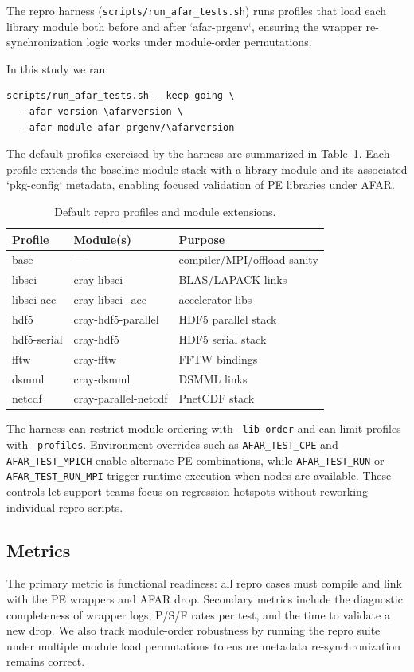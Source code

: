 The repro harness (\texttt{scripts/run\_afar\_tests.sh}) runs profiles that load each
library module both before and after `afar-prgenv`, ensuring the wrapper
re-synchronization logic works under module-order permutations.

In this study we ran:
\begin{verbatim}
scripts/run_afar_tests.sh --keep-going \
  --afar-version \afarversion \
  --afar-module afar-prgenv/\afarversion
\end{verbatim}

The default profiles exercised by the harness are summarized in
Table~\ref{tab:profiles}. Each profile extends the baseline module stack with a
library module and its associated `pkg-config` metadata, enabling focused
validation of PE libraries under AFAR.

\begin{table}[t]
  \centering
  \small
  \setlength{\tabcolsep}{3pt}
  \caption{Default repro profiles and module extensions.}
  \label{tab:profiles}
  \begin{tabular}{l l l}
    \hline
    Profile & Module(s) & Purpose \\
    \hline
    base & --- & compiler/MPI/offload sanity \\
    libsci & cray-libsci & BLAS/LAPACK links \\
    libsci-acc & cray-libsci\_acc & accelerator libs \\
    hdf5 & cray-hdf5-parallel & HDF5 parallel stack \\
    hdf5-serial & cray-hdf5 & HDF5 serial stack \\
    fftw & cray-fftw & FFTW bindings \\
    dsmml & cray-dsmml & DSMML links \\
    netcdf & cray-parallel-netcdf & PnetCDF stack \\
    \hline
  \end{tabular}
\end{table}

The harness can restrict module ordering with \texttt{--lib-order} and can
limit profiles with \texttt{--profiles}. Environment overrides such as
\texttt{AFAR\_TEST\_CPE} and \texttt{AFAR\_TEST\_MPICH} enable alternate PE
combinations, while \texttt{AFAR\_TEST\_RUN} or \texttt{AFAR\_TEST\_RUN\_MPI}
trigger runtime execution when nodes are available. These controls let support
teams focus on regression hotspots without reworking individual repro scripts.

\subsection{Metrics}
\label{sec:metrics}
The primary metric is functional readiness: all repro cases must compile and
link with the PE wrappers and AFAR drop. Secondary metrics include the
diagnostic completeness of wrapper logs, P/S/F rates per test, and the time to
validate a new drop. We also track module-order robustness by running the repro
suite under multiple module load permutations to ensure metadata
re-synchronization remains correct.
